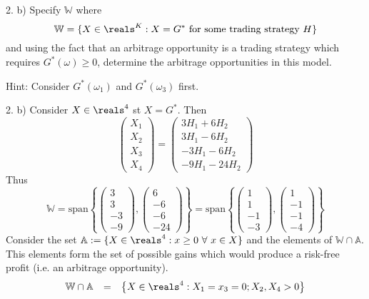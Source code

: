 \documentclass[11pt,a4paper]{article}
\begin{document}
\begin{question}{2. b)}
  Specify $\mathbb{W}$ where
  \[ \mathbb{W}=\{X\in\reals^K:X=G^*\text{ for some trading strategy }H\} \]
  and using the fact that an arbitrage opportunity is a trading strategy which requires $G^*(\omega)\geq0$, determine the arbitrage opportunities in this model.
  \par Hint: Consider $G^*(\omega_1)$ and $G^*(\omega_3)$ first.
\end{question}

\begin{answer}{2. b)}
  Consider $X\in\reals^4$ st $X=G^*$. Then
  \[ \begin{pmatrix} X_1\\X_2\\X_3\\X_4\end{pmatrix}=\begin{pmatrix}3H_1+6H_2\\3H_1-6H_2\\-3H_1-6H_2\\-9H_1-24H_2\end{pmatrix} \]
  Thus
  \[ \mathbb{W}=\text{span}\left\{\begin{pmatrix}3\\3\\-3\\-9\end{pmatrix},\begin{pmatrix}6\\-6\\-6\\-24\end{pmatrix}\right\}=\text{span}\left\{\begin{pmatrix}1\\1\\-1\\-3\end{pmatrix},\begin{pmatrix}1\\-1\\-1\\-4\end{pmatrix}\right\} \]
  Consider the set $\mathbb{A}:=\{X\in\reals^4:x\geq0\ \forall\ x\in X\}$ and the elements of $\mathbb{W}\cap\mathbb{A}$. This elements form the set of possible gains which would produce a risk-free profit (i.e. an arbitrage opportunity).
  \[\begin{array}{rcl}
    \mathbb{W}\cap\mathbb{A}&=&\big\{X\in\reals^4:X_1=x_3=0;X_2,X_4>0\big\}\\

\end{array}\]
\end{answer}
\end{document}
